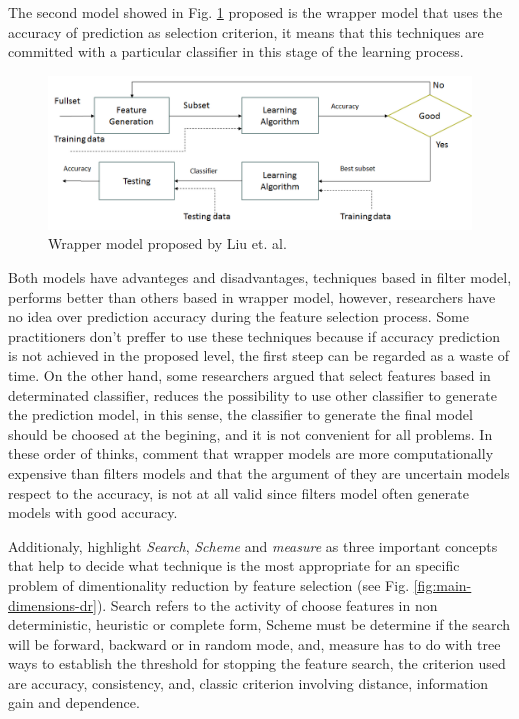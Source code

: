\documentclass[]{book}
\begin{document}
The second model showed in Fig. \ref{fig:wrapper-model} proposed is the
wrapper model that uses the accuracy of prediction as selection
criterion, it means that this techniques are committed with a particular
classifier in this stage of the learning process.

\begin{figure}[H]

{\centering \includegraphics[width=0.6\linewidth]{images/wrapper-model} 

}

\caption{Wrapper model proposed by Liu et. al.}\label{fig:wrapper-model}
\end{figure}

Both models have advanteges and disadvantages, techniques based in
filter model, performs better than others based in wrapper model,
however, researchers have no idea over prediction accuracy during the
feature selection process. Some practitioners don't preffer to use these
techniques because if accuracy prediction is not achieved in the
proposed level, the first steep can be regarded as a waste of time. On
the other hand, some researchers argued that select features based in
determinated classifier, reduces the possibility to use other classifier
to generate the prediction model, in this sense, the classifier to
generate the final model should be choosed at the begining, and it is
not convenient for all problems. In these order of thinks,
\citep{Kelleher2015} comment that wrapper models are more
computationally expensive than filters models and that the argument of
they are uncertain models respect to the accuracy, is not at all valid
since filters model often generate models with good accuracy.

Additionaly, \citep{Liu1998} highlight \emph{Search}, \emph{Scheme} and
\emph{measure} as three important concepts that help to decide what
technique is the most appropriate for an specific problem of
dimentionality reduction by feature selection (see Fig.
\ref{fig:main-dimensions-dr}). Search refers to the activity of choose
features in non deterministic, heuristic or complete form, Scheme must
be determine if the search will be forward, backward or in random mode,
and, measure has to do with tree ways to establish the threshold for
stopping the feature search, the criterion used are accuracy,
consistency, and, classic criterion involving distance, information gain
and dependence.
\end{document}

